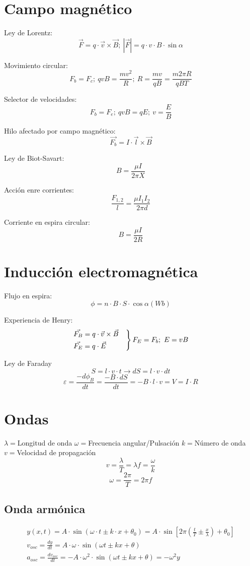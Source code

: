 \documentclass{article}
\begin{document}
\begin{multicols}{2}[]
\section{Campo magnético}
Ley de Lorentz:
\[\vec{F}=q\cdot\vec{v}\times\vec{B};\ |\vec{F}|=q\cdot v\cdot B \cdot\sin{\alpha}\]

Movimiento circular:
\[F_b = F_c;\ qvB=\frac{mv^2}{R};\ R=\frac{mv}{qB}=\frac{m2\pi R}{qBT}\]

Selector de velocidades:
\[F_b = F_e;\ qvB= qE;\ v=\frac{E}{B}\]

Hilo afectado por campo magnético:
\[\vec{F_b}=I\cdot \vec{l}\times \vec{B}\]

Ley de Biot-Savart:
\[B=\frac{\mu I}{2\pi X}\]

Acción enre corrientes:
\[\frac{F_{1,2}}{l}=\frac{\mu I_1I_2}{2\pi d}\]

Corriente en espira circular:
\[B=\frac{\mu I}{2R}\]


\section{Inducción electromagnética}
Flujo en espira:
\[\phi=n\cdot B\cdot S\cdot \cos\alpha(Wb)\]

Experiencia de Henry:
\[
\begin{rcases}
  \vec{F_B}=q\cdot\vec{v}\times\vec{B} &\\
  \vec{F_E}=q\cdot\vec{E}
\end{rcases}  
F_E=F_b;\ E=vB
\]

Ley de Faraday
\[S=l\cdot v\cdot t\rightarrow dS=l\cdot v\cdot dt\]
\[\varepsilon=\frac{-d\phi_B}{dt}=\frac{-B\cdot dS}{dt}=-B\cdot l\cdot v=V=I\cdot R\]

\section{Ondas}
$\lambda=$Longitud de onda
$\omega=$Frecuencia angular/Pulsación
$k=$Número de onda
$v=$Velocidad de propagación
\[v=\frac{\lambda}{T}=\lambda f=\frac{\omega}{k}\]
\[\omega=\frac{2\pi}{T}=2\pi f\]

\subsection{Onda armónica}
\begin{gather*}
  y(x,t)=A\cdot\sin(\omega\cdot t\pm k\cdot x +\theta_0 )=A\cdot\sin\left[ 2\pi\left( \frac{t}{T} \pm \frac{x}{\lambda} \right) +\theta_0 \right] \\
  v_{osc}=\frac{dy}{dt}=A\cdot\omega\cdot\sin\left( \omega t\pm kx + \theta \right) \\
  a_{osc}=\frac{dv_{osc}}{dt}=-A\cdot\omega^2\cdot\sin\left( \omega t\pm kx + \theta \right) = -\omega^2y
\end{gather*}


\end{multicols}
\end{document}
